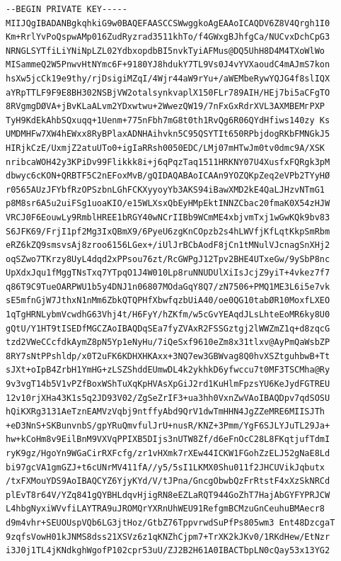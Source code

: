 \documentclass[12pt,a4paper]{article}
\begin{document}
\begin{lstlisting}[caption=Private Key]
--BEGIN PRIVATE KEY-----
MIIJQgIBADANBgkqhkiG9w0BAQEFAASCCSWwggkoAgEAAoICAQDV6Z8V4Qrgh1I0
Km+RrlYvPoQspwAMp016ZudRyzrad3511khTo/f4GWxgBJhfgCa/NUCvxDchCpG3
NRNGLSYTfiLiYNiNpLZL02YdbxopdbBI5nvkTyiAFMus@DQ5UhH8D4M4TXoWlWo
MISammeQ2W5PnwvHtNYmc6F+9180YJ8hdukY7TL9Vs0J4vYVXaoudC4mAJmS7kon
hsXw5jcCk19e9thy/rjDsigiMZqI/4Wjr44aW9rYu+/aWEMbeRywYQJG4f8slIQX
aYRpTTLF9F9E8BH302NSBjVW2otalsynkvaplX150FLr789AIH/HEj7bi5aCFgTO
8RVgmgDØVA+jBvKLaALvm2YDxwtwu+2WwezQW19/7nFxGxRdrXVL3AXMBEMгPXP
TyH9KdEkAhbSQxuqq+1Uenm+775nFbh7mG8t0th1RvQg6R06QYdHfiws140zy Ks
UMDMHFw7XW4hEWxx8RyBPlaxADNHAihvkn5C95QSYTIt650RPbjdogRKbFMNGkJ5
HIRjkCzE/UxmjZ2atuUTo0+igIaRRsh0050EDC/LMj07mHTwJm0tv0dmc9A/XSK
nribcaWOH42y3KPiDv99Flikkk8i+j6qPqzTaq1511HRKNY07U4XusfxFQRgk3pM
dbwyc6cKON+QRBTF5C2nEFoxMvB/gQIDAQABAoICAAn9YOZQKpZeq2eVPb2TYyHØ
r0565AUzJFYbfRzOPSzbnLGhFCKXyyoyYb3AKS94iBawXMD2kE4QaLJHzvNTmG1
p8M8sr6A5u2uiFSg1uoaKIO/e15WLXsxQbEyHMpEktINNZCbac20fmaK0X54zHJW
VRCJ0F6EouwLy9RmblHREE1bRGY40wNCrIIBb9WCmME4xbjvmTxj1wGwKQk9bv83
S6JFK69/FrjI1pf2Mg3IxQBmX9/6PyeU6zgKnCOpzb2s4hLWVfjKfLqtKkpSmRbm
eRZ6kZQ9smsvsAj8zroo6156LGex+/iUlJrBCbAodF8jCn1tMNulVJcnagSnXHj2
oqSZwo7TKrzy8UyL4dqd2xPPsou76zt/RcGWPgJ12Tpv2BHE4UTxeGw/9ySbP8nc
UpXdxJqu1fMggTNsTxq7YTpqO1J4W010Lp8ruNNUDUlXiIsJcjZ9yiT+4vkez7f7
q86T9C9TueOARPWU1b5y4DNJ1n06807MOdaGqY8Q7/zN7506+PMQ1ME3L6i5e7vk
sE5mfnGjW7JthxN1nMm6ZbkQTQPHfXbwfqzbUiA40/oe0QG10tabØR10MoxfLXEO
1qTgHRNLybmVcwdhG63Vhj4t/H6FyY/hZKfm/w5cGvYEAqdJLsLhteEoMR6ky8U0
gQtU/Y1HT9tISEDfMGCZAoIBAQDqSEa7fyZVAxR2FSSGztgj2lWWZmZ1q+d8zqcG
tzd2VWeCCcfdkAymZ8pN5Yp1eNyHu/7iQeSxf9610eZm8x31tlxv@AyPmQaWsbZP
8RY7sNtPPshldp/x0T2uFK6KDHXHKAxx+3NQ7ew3GBWvag8Q0hvXSZtguhbwB+Tt
sJXt+oIpB4ZrbH1YmHG+zLSZShddEUmwDL4k2ykhkD6yfwccu7t0MF3TSCMha@Ry
9v3vgT14b5V1vPZfBoxWShTuXqKpHVAsXpGiJ2rd1KuHlmFpzsYU6KeJydFGTREU
12v10rjXHa43K1s5q2JD93V02/ZgSeZrIF3+ua3hh0VxnZwVAoIBAQDpv7qdSOSU
hQiKXRg3131AeTznEAMVzVqbj9ntffyAbd9QrV1dwTmHHN4JgZZeMRE6MIISJTh
+eD3NnS+SKBunvnbS/gpYRuQmvfulJrU+nusR/KNZ+3Pmm/YgF6SJLYJuTL29Ja+
hw+kCoHm8v9EilBnM9VXVqPPIXB5DIjs3nUTW8Zf/d6eFnOcC28L8FKqtjufTdmI
ryK9gz/HgoYn9WGaCirRXFcfg/zr1vHXmk7rXEw44ICKW1FGohZzELJ52gNaE8Ld
bi97gcVA1gmGZJ+t6cUNrMV411fA//y5/5sI1LKMX0Shu011f2JHCUVikJqbutx
/txFXMouYDS9AoIBAQCYZ6YjyKYd/V/tJPna/GncgObwbQzFrRtstF4xXzSkNRCd
plEvT8r64V/YZq841gQYBHLdqvHjigRN8eEZLaRQT944GoZhT7HajAbGYFYPRJCW
L4hbgNyxiWVvfiLAYTRA9uJROMQrYXRnUhWEU91RefgmBCMzuGnCeuhuBMAecr8
d9m4vhr+SEUOUspVQb6LG3jtHoz/GtbZ76TppvrwdSuPfPs805wm3 Ent48DzcgaT
9zqfsVowH01kJNMS8dss21XSVz6z1qKNZhCjpm7+TrXK2kJKv0/1RKdHew/EtNzr
i3J0j1TL4jKNdkghWgofP102cpr53uU/ZJ2B2H61A0IBACTbpLN0cQay53x13YG2

\end{lstlisting}
\end{document}
